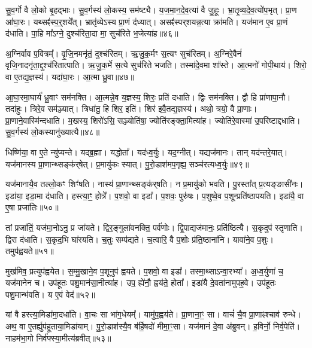 सु॒व॒र्गो वै लो॒को बृ॒हद्भाः।
सु॒व॒र्गस्य॑ लो॒कस्य॒ सम॑ष्ट्यै।
य॒ज॒मा॒न॒दे॒व॒त्या॑ वै जु॒हूः।
भ्रा॒तृ॒व्य॒दे॒व॒त्यो॑प॒भृत्।
प्रा॒ण आ॑घा॒रः।
यथ्सꣴ॑स्प॒र्॒शये᳚त्।
भ्रातृ॑व्येऽस्य प्रा॒णं द॑ध्यात्।
असꣴ॑स्पर्‌\mbox{}शयन्न॒त्या क्रा॑मति।
यज॑मान ए॒व प्रा॒णं द॑धाति।
पा॒हि मा᳚\-ऽग्ने॒ दुश्च॑रिता॒दा मा॒ सुच॑रिते भ॒जेत्या॑ह॥४६॥\ip

अ॒ग्निर्वाव प॒वित्रम्᳚।
वृ॒जि॒नमनृ॑तं॒ दुश्च॑रितम्।
ऋ॒जु॒क॒र्मꣳ स॒त्यꣳ सुच॑रितम्।
अ॒ग्निरे॒वैनं॑ वृजि॒नादनृ॑ता॒द्दुश्च॑रितात्पाति।
ऋ॒जु॒क॒र्मे स॒त्ये सुच॑रिते भजति।
तस्मा॑दे॒वमा शा᳚स्ते।
आ॒त्मनो॑ गोपी॒थाय॑।
शिरो॒ वा ए॒तद्य॒ज्ञस्य॑।
यदा॑घा॒रः।
आ॒त्मा ध्रु॒वा॥४७॥\ip

आ॒घा॒रमा॒घार्य॑ ध्रु॒वाꣳ सम॑नक्ति।
आ॒त्मन्ने॒व य॒ज्ञस्य॒ शिरः॒ प्रति॑ दधाति।
द्विः सम॑नक्ति।
द्वौ हि प्रा॑णापा॒नौ।
तदा॑हुः।
त्रिरे॒व सम॑ञ्ज्यात्।
त्रिधा॑तु॒ हि शिर॒ इति॑।
शिर॑ इवै॒तद्य॒ज्ञस्य॑।
अथो॒ त्रयो॒ वै प्रा॒णाः।
प्रा॒णाने॒वास्मि॑न्दधाति।
म॒खस्य॒ शिरो॑ऽसि॒ सञ्ज्योति॑षा॒ ज्योति॑रङ्क्ता॒मित्या॑ह।
ज्योति॑रे॒वास्मा॑ उ॒परि॑ष्टाद्दधाति।
सु॒व॒र्गस्य॑ लो॒कस्यानु॑ख्यात्यै॥४८॥\ip\anuvakamend[परि॑दधाति प्रा॒णं द॑धाति॒ हि य॒ज्ञो घा॑रयति॒ नम॒ इत्या॑ह प॒श्चाद्वी॒र्या॑णीत्या॑ह॒ भा इत्या॑ह भ॒जेत्या॑ह ध्रु॒वैवास्मि॑न्दधाति॒ त्रीणि॑ च]

धिष्णि॑या॒ वा ए॒ते न्यु॑प्यन्ते।
यद्ब्र॒ह्मा।
यद्धोता᳚।
यद॑ध्व॒र्युः।
यद॒ग्नीत्।
यद्यज॑मानः।
तान् यद॑न्तरे॒यात्।
यज॑मानस्य प्रा॒णा\-न्थ्सङ्क॑\-र्‌\mbox{}षेत्।
प्र॒मायु॑कः स्यात्।
पु॒रो॒डाश॑मप॒गृह्य॒ सञ्च॑र\-त्यध्व॒र्युः॥४९॥\ip

यज॑मानायै॒व तल्लो॒कꣳ शिꣳ॑षति।
नास्य॑ प्रा॒णान्थ्सङ्क॑र्‌\mbox{}\-षति।
न प्र॒मायु॑को भवति।
पु॒रस्ता᳚त् प्र॒त्यङ्ङासी॑नः।
इडा॑या॒ इडा॒\-मा द॑धाति।
हस्त्या॒ꣳ॒ होत्रे᳚।
प॒शवो॒ वा इडा᳚।
प॒शवः॒ पुरु॑षः।
प॒शुष्वे॒व प॒शून्प्रति॑\-ष्ठापयति।
इडा॑यै॒ वा ए॒षा प्रजा॑तिः॥५०॥\ip

तां प्रजा॑तिं॒ यज॑मा॒नोऽनु॒ प्र जा॑यते।
द्विर॒ङ्गुला॑वनक्ति॒ पर्व॑णोः।
द्वि॒पाद्यज॑मानः॒ प्रति॑\-ष्ठित्यै।
स॒कृदुप॑ स्तृणाति।
द्विरा द॑धाति।
स॒कृद॒भि घा॑रयति।
च॒तुः सम्प॑द्यते।
च॒त्वारि॒ वै प॒शोः प्र॑ति॒ष्ठाना॑नि।
यावा॑ने॒व प॒शुः।
तमुप॑ह्वयते॥५१॥\ip

मुख॑मिव॒ प्रत्युप॑ह्वयेत।
स॒म्मु॒खाने॒व प॒शूनुप॑ ह्वयते।
प॒शवो॒ वा इडा᳚।
तस्मा॒थ्सा\-ऽन्वा॒रभ्या᳚।
अ॒ध्व॒र्युणा॑ च॒ यज॑मानेन च।
उप॑हूतः पशु॒मान॑सा॒नीत्या॑ह।
उप॒ ह्ये॑नौ॒ ह्वय॑ते॒ होता᳚।
इडा॑यै दे॒वता॑नामुपह॒वे।
उप॑हूतः पशु॒मान्भ॑वति।
य ए॒वं वेद॑॥५२॥\ip

यां वै हस्त्या॒मिडा॑मा॒दधा॑ति।
वा॒चः सा भा॑ग॒धेयम्᳚।
यामु॑प॒ह्वय॑ते।
प्रा॒णाना॒ꣳ॒ सा।
वाचं॑ चै॒व प्रा॒णाꣴश्चाव॑ रुन्धे।
अथ॒ वा ए॒तर्ह्युप॑हूताया॒मिडा॑याम्।
पु॒रो॒डाश॑स्यै॒व ब॑र्हि॒षदो॑ मीमा॒ꣳ॒सा।
यज॑मानं दे॒वा अ॑ब्रुवन्।
ह॒विर्नो॒ निर्व॒पेति॑।
नाहम॑भा॒गो निर्व॑फ्स्या॒मीत्य॑ब्रवीत्॥५३॥\ip

